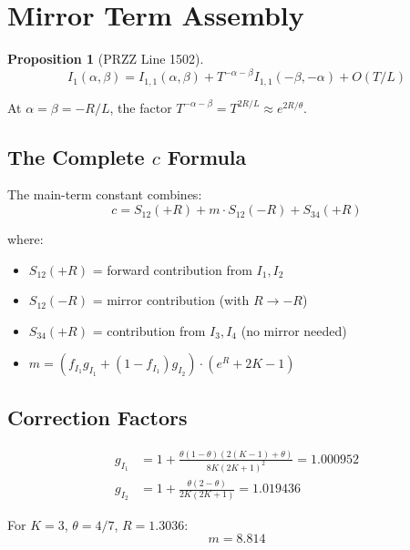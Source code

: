 \documentclass[11pt]{article}
\newtheorem{proposition}{Proposition}
\begin{document}
\section{Mirror Term Assembly}

\begin{proposition}[PRZZ Line 1502]
\begin{equation}
I_1(\alpha,\beta) = I_{1,1}(\alpha,\beta) + T^{-\alpha-\beta} I_{1,1}(-\beta,-\alpha) + O(T/L)
\end{equation}
\end{proposition}

At $\alpha = \beta = -R/L$, the factor $T^{-\alpha-\beta} = T^{2R/L} \approx e^{2R/\theta}$.

\subsection{The Complete $c$ Formula}

The main-term constant combines:
\begin{equation}
\boxed{c = S_{12}(+R) + m \cdot S_{12}(-R) + S_{34}(+R)}
\end{equation}

where:
\begin{itemize}
\item $S_{12}(+R)$ = forward contribution from $I_1, I_2$
\item $S_{12}(-R)$ = mirror contribution (with $R \to -R$)
\item $S_{34}(+R)$ = contribution from $I_3, I_4$ (no mirror needed)
\item $m = (f_{I_1} g_{I_1} + (1-f_{I_1}) g_{I_2}) \cdot (e^R + 2K - 1)$
\end{itemize}

\subsection{Correction Factors}

\begin{align}
g_{I_1} &= 1 + \frac{\theta(1-\theta)(2(K-1)+\theta)}{8K(2K+1)^2} = 1.000952 \\
g_{I_2} &= 1 + \frac{\theta(2-\theta)}{2K(2K+1)} = 1.019436
\end{align}

For $K=3$, $\theta = 4/7$, $R = 1.3036$:
\begin{equation}
m = 8.814
\end{equation}
\end{document}

